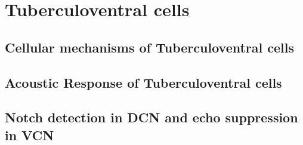 \section{Tuberculoventral cells}


\subsection{Cellular mechanisms of Tuberculoventral cells}

\subsection{Acoustic Response of Tuberculoventral cells}

\subsection{Notch detection in DCN and echo suppression in VCN}





